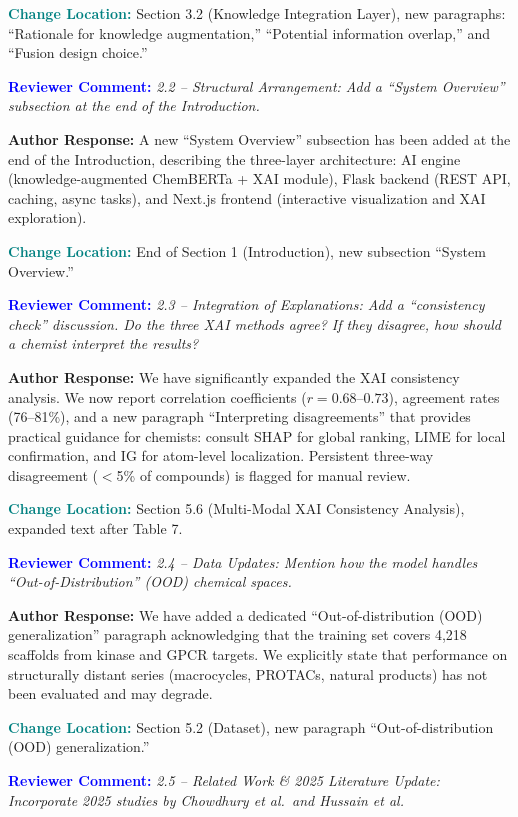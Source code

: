 \documentclass[12pt]{article}
\newcommand{\RC}[1]{\textbf{\textcolor{blue}{Reviewer Comment:}} \textit{#1}\vspace{0.3em}}
\newcommand{\AR}[1]{\textbf{Author Response:} #1\vspace{0.8em}}
\newcommand{\CH}[1]{\textbf{\textcolor{teal}{Change Location:}} #1\vspace{0.5em}}
\begin{document}
\CH{Section 3.2 (Knowledge Integration Layer), new paragraphs: ``Rationale for knowledge augmentation,'' ``Potential information overlap,'' and ``Fusion design choice.''}

\bigskip

\RC{2.2 -- Structural Arrangement: Add a ``System Overview'' subsection at the end of the Introduction.}

\AR{A new ``System Overview'' subsection has been added at the end of the Introduction, describing the three-layer architecture: AI engine (knowledge-augmented ChemBERTa + XAI module), Flask backend (REST API, caching, async tasks), and Next.js frontend (interactive visualization and XAI exploration).}

\CH{End of Section 1 (Introduction), new subsection ``System Overview.''}

\bigskip

\RC{2.3 -- Integration of Explanations: Add a ``consistency check'' discussion. Do the three XAI methods agree? If they disagree, how should a chemist interpret the results?}

\AR{We have significantly expanded the XAI consistency analysis. We now report correlation coefficients ($r = 0.68$--$0.73$), agreement rates (76--81\%), and a new paragraph ``Interpreting disagreements'' that provides practical guidance for chemists: consult SHAP for global ranking, LIME for local confirmation, and IG for atom-level localization. Persistent three-way disagreement ($<$5\% of compounds) is flagged for manual review.}

\CH{Section 5.6 (Multi-Modal XAI Consistency Analysis), expanded text after Table 7.}

\bigskip

\RC{2.4 -- Data Updates: Mention how the model handles ``Out-of-Distribution'' (OOD) chemical spaces.}

\AR{We have added a dedicated ``Out-of-distribution (OOD) generalization'' paragraph acknowledging that the training set covers 4,218 scaffolds from kinase and GPCR targets. We explicitly state that performance on structurally distant series (macrocycles, PROTACs, natural products) has not been evaluated and may degrade.}

\CH{Section 5.2 (Dataset), new paragraph ``Out-of-distribution (OOD) generalization.''}

\bigskip

\RC{2.5 -- Related Work \& 2025 Literature Update: Incorporate 2025 studies by Chowdhury et al.\ and Hussain et al.}
\end{document}
